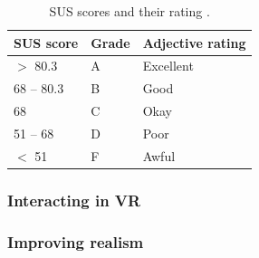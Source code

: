 \begin{table}[H]
\centering
\begin{tabular}{l|l|l}
{ \textbf{SUS score}} & { \textbf{Grade}} & { \textbf{Adjective rating}} \\ \hline
$>$ 80.3   & A &  Excellent                                 \\ 
68 – 80.3   & B & Good                                  \\ 
68   & C   &   Okay                              \\ 
51 – 68   & D   &  Poor                               \\ 
$<$ 51  & F      &     Awful                         \\ 
\end{tabular}
\caption{SUS scores and their rating \cite{SusMeasuringInterpret}.}
\label{table:SUSinterpret}
\end{table}




\subsubsection{Interacting in VR}



\subsubsection{Improving realism}




\cleardoublepage